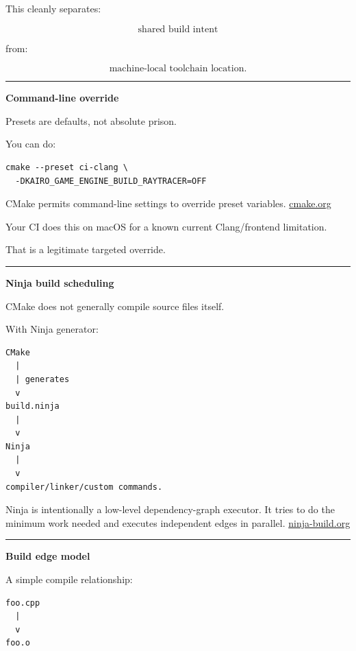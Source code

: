 This cleanly separates:

\[
\text{shared build intent}
\]

from:

\[
\text{machine-local toolchain location}.
\]

\begin{center}\rule{0.5\linewidth}{0.5pt}\end{center}

\textbf{Command-line override}

Presets are defaults, not absolute prison.

You can do:

\begin{verbatim}
cmake --preset ci-clang \
  -DKAIRO_GAME_ENGINE_BUILD_RAYTRACER=OFF
\end{verbatim}

CMake permits command-line settings to override preset variables. \href{https://cmake.org/cmake/help/git-stage/guide/tutorial/Configuration\%20and\%20Cache\%20Variables.html?utm_source=chatgpt.com}{cmake.org}

Your CI does this on macOS for a known current Clang/frontend limitation.

That is a legitimate targeted override.

\begin{center}\rule{0.5\linewidth}{0.5pt}\end{center}

\textbf{Ninja build scheduling}

CMake does not generally compile source files itself.

With Ninja generator:

\begin{verbatim}
CMake
  |
  | generates
  v
build.ninja
  |
  v
Ninja
  |
  v
compiler/linker/custom commands.
\end{verbatim}

Ninja is intentionally a low-level dependency-graph executor. It tries to do the minimum work needed and executes independent edges in parallel. \href{https://ninja-build.org/manual.html?utm_source=chatgpt.com}{ninja-build.org}

\begin{center}\rule{0.5\linewidth}{0.5pt}\end{center}

\textbf{Build edge model}

A simple compile relationship:

\begin{verbatim}
foo.cpp
  |
  v
foo.o
\end{verbatim}


